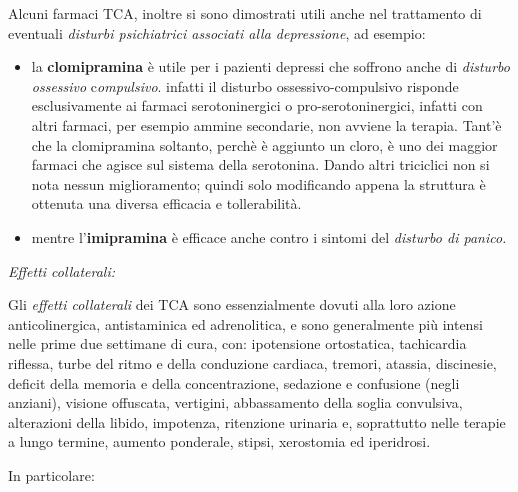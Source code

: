 \documentclass[]{article}
\begin{document}
Alcuni farmaci TCA, inoltre si sono dimostrati utili anche nel
trattamento di eventuali \emph{disturbi psichiatrici associati alla
depressione}, ad esempio:

\begin{itemize}
\item
  la \textbf{clomipramina} è utile per i pazienti depressi che soffrono
  anche di \emph{disturbo ossessivo} c\emph{ompulsivo}. infatti il
  disturbo ossessivo-compulsivo risponde esclusivamente ai farmaci
  serotoninergici o pro-serotoninergici, infatti con altri farmaci, per
  esempio ammine secondarie, non avviene la terapia. Tant'è che la
  clomipramina soltanto, perchè è aggiunto un cloro, è uno dei maggior
  farmaci che agisce sul sistema della serotonina. Dando altri
  triciclici non si nota nessun miglioramento; quindi solo modificando
  appena la struttura è ottenuta una diversa efficacia e tollerabilità.
\end{itemize}

\begin{itemize}
\item
  mentre l'\textbf{imipramina} è efficace anche contro i sintomi del
  \emph{disturbo di panico.}
\end{itemize}

\emph{\emph{Effetti collaterali:}}

Gli \emph{effetti collaterali} dei TCA sono essenzialmente dovuti alla
loro azione anticolinergica, antistaminica ed adrenolitica, e sono
generalmente più intensi nelle prime due settimane di cura, con:
ipotensione ortostatica, tachicardia riflessa, turbe del ritmo e della
conduzione cardiaca, tremori, atassia, discinesie, deficit della memoria
e della concentrazione, sedazione e confusione (negli anziani), visione
offuscata, vertigini, abbassamento della soglia convulsiva, alterazioni
della libido, impotenza, ritenzione urinaria e, soprattutto nelle
terapie a lungo termine, aumento ponderale, stipsi, xerostomia ed
iperidrosi.

In particolare:
\end{document}
